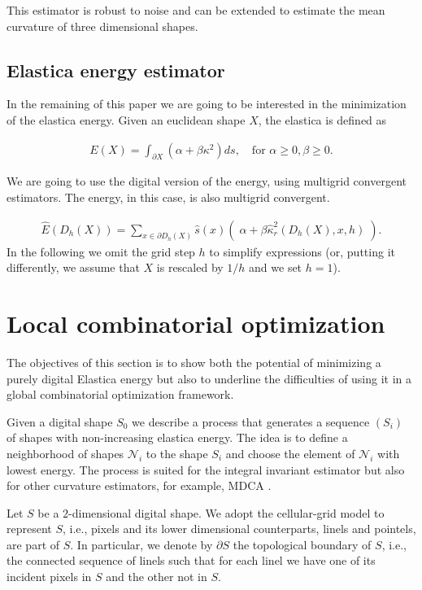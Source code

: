 \documentclass[runningheads]{llncs}
\begin{document}
This estimator is robust to noise and can be extended to estimate the mean curvature of three dimensional shapes.

\subsection{Elastica energy estimator}

In the remaining of this paper we are going to be interested in the minimization of the elastica energy. Given an euclidean shape $X$, the elastica is defined as

\begin{align*}
  E(X) = \int_{\partial X}{(\alpha + \beta \kappa^2) ds}, \quad \text{for~} \alpha \ge 0, \beta \ge 0.
\end{align*}

We are going to use the digital version of the energy, using multigrid convergent estimators. The energy, in this case, is also multigrid convergent.


\begin{align}
	\hat{E}( D_h(X) ) = \sum_{x \in \partial D_h(X)}{ \hat{s}(x)\left(\; \alpha + \beta \hat{\kappa}_{r}^2(D_h(X),x,h) \; \right)}.
	\label{eq:digital-energy}
\end{align}
 In the following we omit the grid step $h$ to simplify expressions (or, putting it differently, we assume that $X$ is rescaled by $1/h$ and we set $h=1$).

\section{Local combinatorial optimization}

The objectives of this section is to show both the potential of minimizing a purely digital Elastica energy but also to underline the difficulties of using it in a global combinatorial optimization framework.

Given a digital shape $S_0$ we describe a process that generates a sequence $(S_i)$ of shapes with non-increasing
elastica energy. The idea is to define a neighborhood of shapes
$\mathcal{N}_i$ to the shape $S_i$ and choose the element of
$\mathcal{N}_i$ with lowest energy.  The process is suited for the
integral invariant estimator but also for other curvature estimators,
for example, MDCA \cite{roussillon11mdca}.

Let $S$ be a $2$-dimensional digital shape. We adopt the cellular-grid model to represent $S$, i.e., pixels and its lower dimensional counterparts, linels and pointels, are part of $S$. In particular, we denote by $\partial S$ the topological boundary of $S$, i.e., the connected sequence of linels such that for each linel we have one of its incident pixels in $S$ and the other not in $S$.
\end{document}
